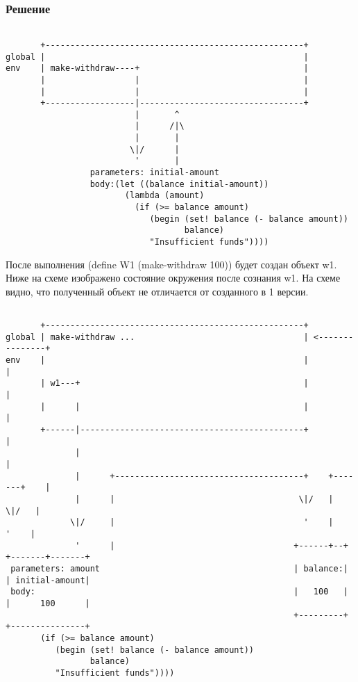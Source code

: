 \documentclass[10pt,a4paper]{article}
\begin{document}
\subsubsection*{Решение}
\newpage
\lstset{ %
basicstyle=\footnotesize,       %
frame=single
}
\begin{lstlisting}

       +----------------------------------------------------+
global |                                                    |
env    | make-withdraw----+                                 |
       |                  |                                 |
       |                  |                                 |
       +------------------|---------------------------------+
                          |       ^
                          |      /|\
                          |       |
                         \|/      |
                          '       |
                 parameters: initial-amount
                 body:(let ((balance initial-amount))
                        (lambda (amount)
                          (if (>= balance amount)
                             (begin (set! balance (- balance amount))
                                    balance)
                             "Insufficient funds"))))

\end{lstlisting}

После выполнения (define W1 (make-withdraw 100)) будет создан объект
w1. Ниже на схеме изображено состояние окружения после сознания w1. На
схеме видно, что полученный объект не отличается от созданного в 1 версии.

\begin{lstlisting}

       +----------------------------------------------------+
global | make-withdraw ...                                  | <---------------+
env    |                                                    |                 |
       | w1---+                                             |                 |
       |      |                                             |                 |
       +------|---------------------------------------------+                 |
              |                                                               |
              |      +--------------------------------------+    +-------+    |
              |      |                                     \|/   |      \|/   |
             \|/     |                                      '    |       '    |
              '      |                                    +------+--+ +-------+-------+
 parameters: amount                                       | balance:| | initial-amount|
 body:                                                    |   100   | |      100      |
                                                          +---------+ +---------------+
       (if (>= balance amount)
          (begin (set! balance (- balance amount))
                 balance)
          "Insufficient funds"))))

\end{lstlisting}
\end{document}
